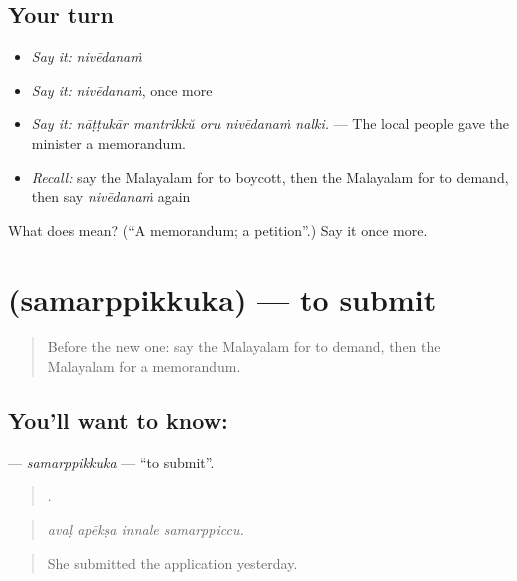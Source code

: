 \subsection*{Your turn}
\begin{itemize}
\raggedright
  \item \emph{Say it:} \emph{nivēdanaṁ}
  \item \emph{Say it:} \emph{nivēdanaṁ}, once more
  \item \emph{Say it:} \emph{nāṭṭukār mantrikkŭ oru nivēdanaṁ nalki.} — The local people gave the minister a memorandum.
  \item \emph{Recall:} say the Malayalam for to boycott, then the Malayalam for to demand, then say \emph{nivēdanaṁ} again
\end{itemize}

\begin{tcolorbox}[breakable,colback=teal!4,colframe=teal!35!black,title={Before you move on}]
What does  mean? (\textquotedblleft{}A memorandum; a petition\textquotedblright{}.) Say it once more.
\end{tcolorbox}
\section[\texorpdfstring{\ml{സമർപ്പിക്കുക} (samarppikkuka)}{സമർപ്പിക്കുക (samarppikkuka)}]{ (samarppikkuka) — to submit}

\label{lesson:ML-C426-samarppikkuka}



\begin{quote}
Before the new one: say the Malayalam for to demand, then the Malayalam for a memorandum.
\end{quote}

\subsection*{You'll want to know: }
\textbf{} — \emph{samarppikkuka} — \textquotedblleft{}to submit\textquotedblright{}.

\begin{quote}
   .
\end{quote}

\begin{quote}
\emph{avaḷ apēkṣa innale samarppiccu.}
\end{quote}

\begin{quote}
She submitted the application yesterday.
\end{quote}

